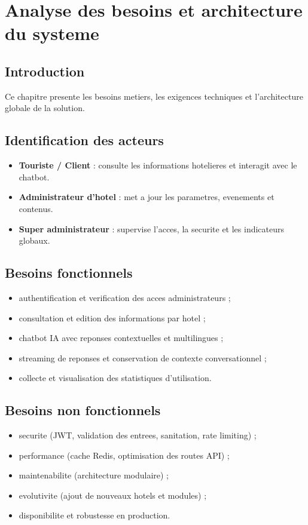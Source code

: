 \chapter{Analyse des besoins et architecture du systeme}

\section{Introduction}
Ce chapitre presente les besoins metiers, les exigences techniques et l'architecture globale de la solution.

\section{Identification des acteurs}
\begin{itemize}
  \item \textbf{Touriste / Client} : consulte les informations hotelieres et interagit avec le chatbot.
  \item \textbf{Administrateur d'hotel} : met a jour les parametres, evenements et contenus.
  \item \textbf{Super administrateur} : supervise l'acces, la securite et les indicateurs globaux.
\end{itemize}

\section{Besoins fonctionnels}
\begin{itemize}
  \item authentification et verification des acces administrateurs ;
  \item consultation et edition des informations par hotel ;
  \item chatbot IA avec reponses contextuelles et multilingues ;
  \item streaming de reponses et conservation de contexte conversationnel ;
  \item collecte et visualisation des statistiques d'utilisation.
\end{itemize}

\section{Besoins non fonctionnels}
\begin{itemize}
  \item securite (JWT, validation des entrees, sanitation, rate limiting) ;
  \item performance (cache Redis, optimisation des routes API) ;
  \item maintenabilite (architecture modulaire) ;
  \item evolutivite (ajout de nouveaux hotels et modules) ;
  \item disponibilite et robustesse en production.
\end{itemize}


